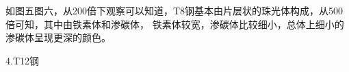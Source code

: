 \documentclass[a4paper,utf8]{article}
\begin{document}
如图五图六，从200倍下观察可以知道，T8钢基本由片层状的珠光体构成，从500倍可知，其中由铁素体和渗碳体，
铁素体较宽，渗碳体比较细小，总体上细小的渗碳体呈现更深的颜色。
\begin{figure}[!ht]
    \begin{floatrow}
    \end{floatrow}

\end{figure}

4.T12钢
\end{document}
